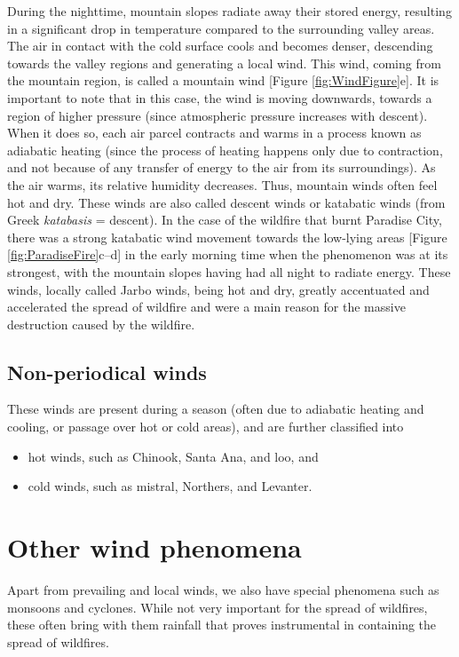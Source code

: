 \documentclass[
  12 pt,
]{Nemilov}
\begin{document}
During the nighttime, mountain slopes radiate away their stored energy, resulting in a significant drop in temperature compared to the surrounding valley areas. The air in contact with the cold surface cools and becomes denser, descending towards the valley regions and generating a local wind. This wind, coming from the mountain region, is called a mountain wind {[}Figure \ref{fig:WindFigure}e{]}. It is important to note that in this case, the wind is moving downwards, towards a region of higher pressure (since atmospheric pressure increases with descent). When it does so, each air parcel contracts and warms in a process known as adiabatic heating (since the process of heating happens only due to contraction, and not because of any transfer of energy to the air from its surroundings). As the air warms, its relative humidity decreases. Thus, mountain winds often feel hot and dry. These winds are also called descent winds or katabatic winds (from Greek \textit{katabasis} = descent). In the case of the wildfire that burnt Paradise City, there was a strong katabatic wind movement towards the low-lying areas {[}Figure \ref{fig:ParadiseFire}c--d{]} in the early morning time when the phenomenon was at its strongest, with the mountain slopes having had all night to radiate energy. These winds, locally called Jarbo winds, being hot and dry, greatly accentuated and accelerated the spread of wildfire and were a main reason for the massive destruction caused by the wildfire.

\subsection{Non-periodical winds}\label{non-periodical-winds}

These winds are present during a season (often due to adiabatic heating and cooling, or passage over hot or cold areas), and are further classified into

\begin{itemize}
\item
  hot winds, such as Chinook, Santa Ana, and loo, and
\item
  cold winds, such as mistral, Northers, and Levanter.
\end{itemize}

\section{Other wind phenomena}\label{other-wind-phenomena}

Apart from prevailing and local winds, we also have special phenomena such as monsoons and cyclones. While not very important for the spread of wildfires, these often bring with them rainfall that proves instrumental in containing the spread of wildfires.

  

\printindex
\end{document}
